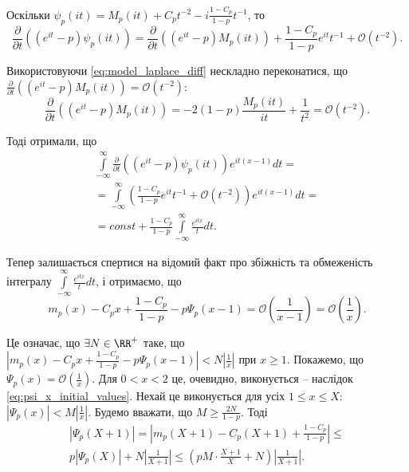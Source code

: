 Оскільки $\psi_{p}(it)=M_{p}(it) + C_{p} t^{-2} - i \frac{1-C_{p}}{1 - p} t^{-1}$, то
\begin{equation*}
\frac{\partial}{\partial t}((e^{it} - p) \psi_{p}(it)) = \frac{\partial}{\partial t}((e^{it} - p) M_{p}(it)) + \frac{1-C_{p}}{1 - p} e^{it} t^{-1} + \mathcal{O}(t^{-2}).
\end{equation*}

Використовуючи \eqref{eq:model_laplace_diff} нескладно переконатися, що $\frac{\partial}{\partial t}((e^{it} - p) M_{p}(it)) = \mathcal{O}(t^{-2})$:
\begin{equation*}
\frac{\partial}{\partial t}((e^{it} - p) M_{p}(it)) = -2(1-p) \frac{M_{p}(it)}{it} + \frac{1}{t^2} = \mathcal{O}(t^{-2}).
\end{equation*}

Тоді отримали, що
\begin{gather*}
\int\limits_{-\infty}^{\infty} \frac{\partial}{\partial t}((e^{it} - p) \psi_{p}(it)) e^{it(x-1)} dt =\\
= \int\limits_{-\infty}^{\infty} \left(\frac{1-C_{p}}{1 - p} e^{it} t^{-1} + \mathcal{O}(t^{-2}) \right) e^{it(x-1)} dt = \\
= const + \frac{1-C_{p}}{1 - p} \int\limits_{-\infty}^{\infty} \frac{e^{itx}}{t} dt.
\end{gather*}

Тепер залишається спертися на відомий факт про збіжність та обмеженість інтегралу $\int\limits_{-\infty}^{\infty} \frac{e^{itx}}{t} dt$, і отримаємо, що 
\begin{equation*}
m_{p}(x) - C_{p} x + \frac{1 - C_p}{1-p} - p\Psi_{p}(x-1) = \mathcal{O}\left(\frac{1}{x-1}\right) = \mathcal{O}\left(\frac{1}{x}\right).
\end{equation*}

Це означає, що $\exists N \in \RR^{+}$ таке, що $|m_{p}(x) - C_{p} x + \frac{1 - C_p}{1-p} - p\Psi_{p}(x-1)| < N \left|\frac{1}{x}\right|$ при $x \geq 1$. Покажемо, що $\Psi_{p}(x) = \mathcal{O}(\frac{1}{x})$. Для $0<x<2$ це, очевидно, виконується -- наслідок \eqref{eq:psi_x_initial_values}. Нехай це виконується для усіх $1 \leq x \leq X$: $|\Psi_{p}(x)| < M\left|\frac{1}{x}\right|$. Будемо вважати, що $M \geq \frac{2N}{1 - p}$. Тоді
\begin{gather*}
|\Psi_{p}(X + 1)| = |m_{p}(X+1) - C_{p} (X+1) + \frac{1 - C_p}{1-p}| \leq \\
 p|\Psi_{p}(X)| + N \left|\frac{1}{X+1}\right| \leq (p M \cdot \frac{X+1}{X} + N) \left|\frac{1}{X+1}\right|.
\end{gather*}

